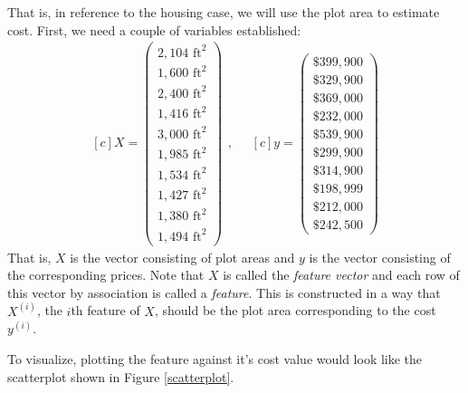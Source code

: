 \documentclass{book}[a5paper]
\begin{document}
That is, in reference to the housing case, we will use the plot
area to estimate cost. First, we need a couple of variables established:
\begin{equation}
    \begin{aligned}[c]
        X = 
        \begin{pmatrix}
            2,104 \text{ ft}^2 \\
            1,600 \text{ ft}^2 \\
            2,400 \text{ ft}^2 \\
            1,416 \text{ ft}^2 \\
            3,000 \text{ ft}^2 \\
            1,985 \text{ ft}^2 \\
            1,534 \text{ ft}^2 \\
            1,427 \text{ ft}^2 \\
            1,380 \text{ ft}^2 \\
            1,494 \text{ ft}^2
        \end{pmatrix}
    \end{aligned},
    \quad
    \begin{aligned}[c]
        y = 
        \begin{pmatrix}
            \$399,900 \\
            \$329,900 \\
            \$369,000 \\
            \$232,000 \\
            \$539,900 \\
            \$299,900 \\
            \$314,900 \\
            \$198,999 \\
            \$212,000 \\
            \$242,500
        \end{pmatrix}
    \end{aligned}
\end{equation}
That is, $X$ is the vector consisting of plot areas and $y$ is the vector
consisting of the corresponding prices.  Note that $X$ is called the
\emph{feature vector} and each row of this vector by association is called a
\emph{feature}.  This is constructed in a way that $X^{(i)}$, the $i$th feature
of $X$, should be the plot area corresponding to the cost $y^{(i)}$. 

To visualize, plotting the feature against it's cost value would look like the
scatterplot shown in Figure \ref{scatterplot}. 
\end{document}

